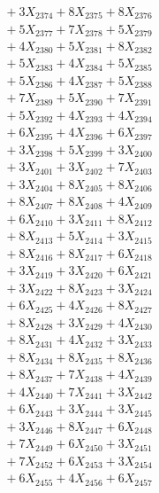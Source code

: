 \documentclass[a4paper,10pt]{article}
\begin{document}
{\begin{align}
&\;  + 3 X_{2374} + 8 X_{2375} + 8 X_{2376} \\[0.3ex]
&\;  + 5 X_{2377} + 7 X_{2378} + 5 X_{2379} \\[0.5ex]\allowbreak
&\;  + 4 X_{2380} + 5 X_{2381} + 8 X_{2382} \\[0.3ex]
&\;  + 5 X_{2383} + 4 X_{2384} + 5 X_{2385} \\[0.3ex]
&\;  + 5 X_{2386} + 4 X_{2387} + 5 X_{2388} \\[0.3ex]
&\;  + 7 X_{2389} + 5 X_{2390} + 7 X_{2391} \\[0.3ex]
&\;  + 5 X_{2392} + 4 X_{2393} + 4 X_{2394} \\[0.3ex]
&\;  + 6 X_{2395} + 4 X_{2396} + 6 X_{2397} \\[0.3ex]
&\;  + 3 X_{2398} + 5 X_{2399} + 3 X_{2400} \\[0.3ex]
&\;  + 3 X_{2401} + 3 X_{2402} + 7 X_{2403} \\[0.3ex]
&\;  + 3 X_{2404} + 8 X_{2405} + 8 X_{2406} \\[0.3ex]
&\;  + 8 X_{2407} + 8 X_{2408} + 4 X_{2409} \\[0.5ex]\allowbreak
&\;  + 6 X_{2410} + 3 X_{2411} + 8 X_{2412} \\[0.3ex]
&\;  + 8 X_{2413} + 5 X_{2414} + 3 X_{2415} \\[0.3ex]
&\;  + 8 X_{2416} + 8 X_{2417} + 6 X_{2418} \\[0.3ex]
&\;  + 3 X_{2419} + 3 X_{2420} + 6 X_{2421} \\[0.3ex]
&\;  + 3 X_{2422} + 8 X_{2423} + 3 X_{2424} \\[0.3ex]
&\;  + 6 X_{2425} + 4 X_{2426} + 8 X_{2427} \\[0.3ex]
&\;  + 8 X_{2428} + 3 X_{2429} + 4 X_{2430} \\[0.3ex]
&\;  + 8 X_{2431} + 4 X_{2432} + 3 X_{2433} \\[0.3ex]
&\;  + 8 X_{2434} + 8 X_{2435} + 8 X_{2436} \\[0.3ex]
&\;  + 8 X_{2437} + 7 X_{2438} + 4 X_{2439} \\[0.5ex]\allowbreak
&\;  + 4 X_{2440} + 7 X_{2441} + 3 X_{2442} \\[0.3ex]
&\;  + 6 X_{2443} + 3 X_{2444} + 3 X_{2445} \\[0.3ex]
&\;  + 3 X_{2446} + 8 X_{2447} + 6 X_{2448} \\[0.3ex]
&\;  + 7 X_{2449} + 6 X_{2450} + 3 X_{2451} \\[0.3ex]
&\;  + 7 X_{2452} + 6 X_{2453} + 3 X_{2454} \\[0.3ex]
&\;  + 6 X_{2455} + 4 X_{2456} + 6 X_{2457} \\[0.3ex]

\end{align}}
\end{document}
